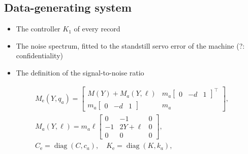 \subsection{Data-generating system}\label{app:setup_system}
\ifdraft
\begin{itemize}
\item The controller $K_1$ of every record
\item The noise spectrum, fitted to the standstill servo error of the machine (?: confidentiality)
\item The definition of the signal-to-noise ratio
\end{itemize}
\fi
{\footnotesize
\setlength{\arraycolsep}{3pt}
\begin{equation*}
\begin{gathered}
 M_{\mathrm e}(Y,q_a)=\begin{bmatrix}M(Y)+M_a(Y,\ell)&m_a\begin{bmatrix}0&-d&1\end{bmatrix}^\top\\m_a\begin{bmatrix}0&-d&1\end{bmatrix}&m_a\end{bmatrix},\\
 M_a(Y,\ell)=m_a\ell\begin{bmatrix}0&-1&0\\-1&2Y+\ell&0\\0&0&0\end{bmatrix},\\
 C_{\mathrm e}=\operatorname{diag}(C,c_a),\quad
 K_{\mathrm e}=\operatorname{diag}(K,k_a),
\end{gathered}
\end{equation*}}

